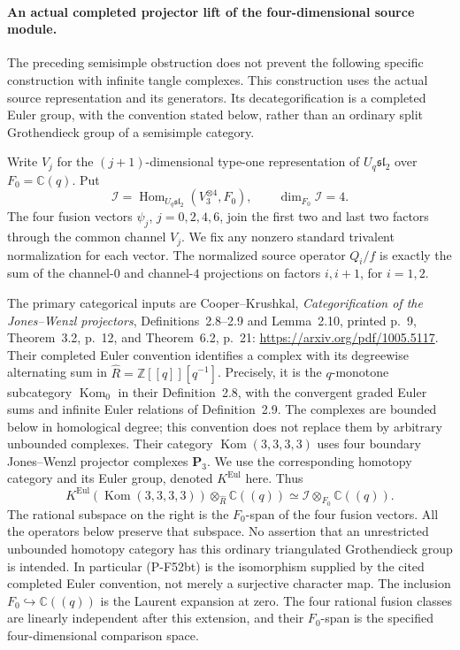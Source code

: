 \paragraph{An actual completed projector lift of the four-dimensional source module.}
The preceding semisimple obstruction does not prevent the following
specific construction with infinite tangle complexes.  This construction
uses the actual source representation and its generators.  Its
decategorification is a completed Euler group, with the convention stated
below, rather than an ordinary split Grothendieck group of a semisimple
category.

Write $V_j$ for the $(j+1)$-dimensional type-one representation of
$U_q\mathfrak{sl}_2$ over $F_0=\mathbb C(q)$.  Put
\[
 \mathcal I=\operatorname{Hom}_{U_q\mathfrak{sl}_2}
       (V_3^{\otimes4},F_0),\qquad
 \dim_{F_0}\mathcal I=4.
                                                               \tag{P-F52bs}
\]
The four fusion vectors $\psi_j$, $j=0,2,4,6$, join the first
two and last two factors through the common channel $V_j$.
We fix any nonzero standard trivalent normalization for each vector.
The normalized source operator $Q_i/f$ is exactly the sum of
the channel-$0$ and channel-$4$ projections on factors $i,i+1$,
for $i=1,2$.

The primary categorical inputs are Cooper--Krushkal,
\emph{Categorification of the Jones--Wenzl projectors},
Definitions~2.8--2.9 and Lemma~2.10, printed p.~9,
Theorem~3.2, p.~12, and Theorem~6.2, p.~21:
\url{https://arxiv.org/pdf/1005.5117}.
Their completed Euler convention identifies a complex with its
degreewise alternating sum in
$\widehat R=\mathbb Z[[q]][q^{-1}]$.
Precisely, it is the $q$-monotone subcategory
$\operatorname{Kom}_0$ in their Definition~2.8, with the
convergent graded Euler sums and infinite Euler relations
of Definition~2.9.  The complexes are bounded below in
homological degree; this convention does not replace them
by arbitrary unbounded complexes.
Their category $\operatorname{Kom}(3,3,3,3)$ uses four boundary
Jones--Wenzl projector complexes $\mathbf P_3$.
We use the corresponding homotopy category and its Euler group,
denoted $K^{\mathrm{Eul}}$ here.
Thus
\[
 K^{\mathrm{Eul}}(\operatorname{Kom}(3,3,3,3))
       \otimes_{\widehat R}\mathbb C((q))
       \simeq\mathcal I\otimes_{F_0}\mathbb C((q)).
                                                               \tag{P-F52bt}
\]
The rational subspace on the right is the $F_0$-span of the four
fusion vectors.  All the operators below preserve that subspace.
No assertion that an unrestricted unbounded homotopy category has
this ordinary triangulated Grothendieck group is intended.
In particular (P-F52bt) is the isomorphism supplied by the cited
completed Euler convention, not merely a surjective character map.
The inclusion $F_0\hookrightarrow\mathbb C((q))$ is the Laurent
expansion at zero.  The four rational fusion classes are linearly
independent after this extension, and their $F_0$-span is the
specified four-dimensional comparison space.


